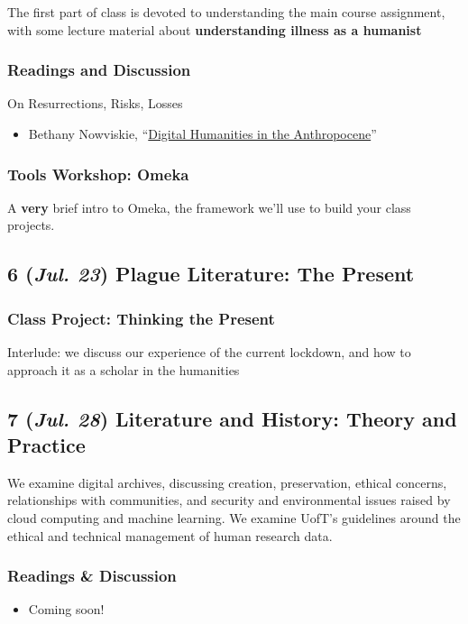 \documentclass[11pt]{article}
\begin{document}
The first part of class is devoted to understanding the main course assignment, with some lecture material about \textbf{understanding illness as a humanist}
\subsubsection*{Readings and Discussion}
\label{sec:org7b14af1}
On Resurrections, Risks, Losses
\begin{itemize}
\item Bethany Nowviskie, “\href{http://nowviskie.org/2014/anthropocene/}{Digital Humanities in the Anthropocene}”
\end{itemize}

\subsubsection*{Tools Workshop: Omeka}
\label{sec:org2c9aea9}
A \textbf{very} brief intro to Omeka, the framework we'll use to build your class projects.

\subsection*{6 (\textit{Jul. 23}) Plague Literature: The Present}
\label{sec:orgfabe1f2}
\subsubsection*{Class Project: Thinking the Present}
\label{sec:org93bf41f}
Interlude: we discuss our experience of the current lockdown, and how to approach it as a scholar in the humanities

\subsection*{7 (\textit{Jul. 28}) Literature and History: Theory and Practice}
\label{sec:orgfd77bd1}
We examine digital archives, discussing creation, preservation, ethical concerns, relationships with communities, and security and environmental issues raised by cloud computing and machine learning.  We examine UofT’s guidelines around the ethical and technical management of human research data.
\subsubsection*{Readings \& Discussion}
\label{sec:orge4de18a}
\begin{itemize}
\item Coming soon!
\end{itemize}
\end{document}
